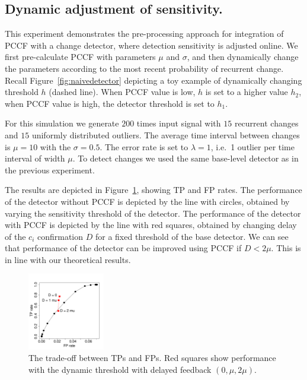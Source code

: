 \subsection{Dynamic adjustment of sensitivity.}
This experiment demonstrates the pre-processing approach for integration of PCCF with a change detector, where detection sensitivity is adjusted online.
We first pre-calculate PCCF with parameters $\mu$ and $\sigma$, and then dynamically change the parameters according to the most recent probability of recurrent change.
Recall Figure~\ref{fig:naivedetector} depicting a toy example of dynamically changing threshold $h$ (dashed line).
When PCCF value is low, $h$ is set to a higher value $h_2$, when PCCF value is high, the detector threshold is set to $h_1$.

For this simulation we generate $200$ times input signal with $15$ recurrent changes and $15$ uniformly distributed outliers.
The average time interval between changes is $\mu = 10$ with the $\sigma = 0.5$.
The error rate is set to $\lambda = 1$, i.e.\ 1 outlier per time interval of width $\mu$.
To detect changes we used the same base-level detector as in the previous experiment.

The results are depicted in Figure~\ref{fig:rocdynamic}, showing TP and FP rates.
The performance of the detector without PCCF is depicted by the line with circles, obtained by varying the sensitivity threshold of the detector.
The performance of the detector with PCCF is depicted by the line with red squares, obtained by changing delay of the $c_i$ confirmation $D$ for a fixed threshold of the base detector.
We can see that performance of the detector can be improved using PCCF if $D < 2 \mu$.
This is in line with our theoretical results.
\begin{figure}[htb!]
\centering
\includegraphics[width=0.30\textwidth]{articles/pics/sdm_paper/ROCImprovementAndDelay3}
\caption{
The trade-off between TPs and FPs.
Red squares show performance with the dynamic threshold with delayed feedback $(0, \mu, 2 \mu)$.}
\label{fig:rocdynamic}
\end{figure}

